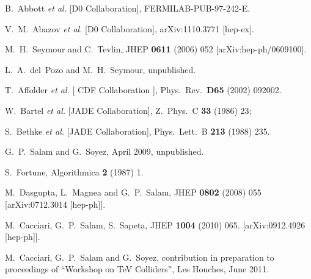 \documentclass[12pt,a4]{article}
\begin{document}
\begin{thebibliography}{99}
  B.~Abbott {\it et al.} [D0 Collaboration],
  FERMILAB-PUB-97-242-E.

  V.~M.~Abazov {\it et al.} [D0 Collaboration],
  arXiv:1110.3771 [hep-ex].

  M.~H.~Seymour and C.~Tevlin,
  JHEP {\bf 0611} (2006) 052
  [arXiv:hep-ph/0609100].

 L.~A.~del~Pozo and M.~H.~Seymour, unpublished.

  T.~Affolder {\it et al.} [ CDF Collaboration ],
  Phys.\ Rev.\  {\bf D65 } (2002)  092002.

  W.~Bartel {\it et al.}  [JADE Collaboration],
  Z.\ Phys.\ C {\bf 33} (1986) 23; 

  S.~Bethke {\it et al.}  [JADE Collaboration],
  Phys.\ Lett.\ B {\bf 213} (1988) 235.

 G.~P.~Salam and G.~Soyez, April 2009,
  unpublished. 

  S.~Fortune,
  Algorithmica {\bf 2} (1987) 1.

  M.~Dasgupta, L.~Magnea and G.~P.~Salam,
  JHEP {\bf 0802} (2008) 055
  [arXiv:0712.3014 [hep-ph]].

  M.~Cacciari, G.~P.~Salam, S.~Sapeta,
  JHEP {\bf 1004 } (2010)  065.
  [arXiv:0912.4926 [hep-ph]].

 M.~Cacciari, G.~P.~Salam and G.~Soyez, contribution in
  preparation to proceedings of ``Workshop on TeV Colliders'', Les
  Houches, June 2011.


\end{thebibliography}
\end{document}
